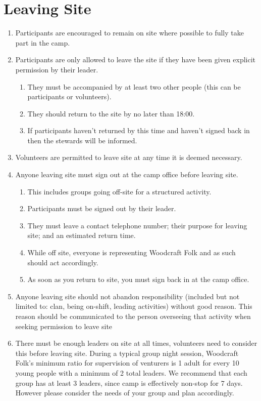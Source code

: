 \documentclass[a4paper, 11pt]{report}
\def\enumMarginIndentOne{4em}
\begin{document}
    \chapter{Leaving Site}
    \begin{enumerate}
        \item Participants are encouraged to remain on site where possible to fully take part in the camp.
        \item Participants are only allowed to leave the site if they have been given explicit permission by their leader.
        \begin{enumerate}[leftmargin=\enumMarginIndentOne]
            \item They must be accompanied by at least two other people (this can be participants or volunteers).
            \item They should return to the site by no later than 18:00.
            \item If participants haven't returned by this time and haven't signed back in then the stewards will be informed.
        \end{enumerate}
        \item Volunteers are permitted to leave site at any time it is deemed necessary.
        \item Anyone leaving site must sign out at the camp office before leaving site.
        \begin{enumerate}[leftmargin=\enumMarginIndentOne]
            \item This includes groups going off-site for a structured activity.
            \item Participants must be signed out by their leader.
            \item They must leave a contact telephone number; their purpose for leaving site; and an estimated return time. 
            \item While off site, everyone is representing Woodcraft Folk and as such should act accordingly. 
            \item As soon as you return to site, you must sign back in at the camp office. 
        \end{enumerate}
        \item Anyone leaving site should not abandon responsibility (included but not limited to: clan, being on-shift, leading activities) without good reason. This reason should be communicated to the person overseeing that activity when seeking permission to leave site
        \item There must be enough leaders on site at all times, volunteers need to consider this before leaving site. During a typical group night session, Woodcraft Folk's minimum ratio for supervision of venturers is 1 adult for every 10 young people with a minimum of 2 total leaders. We recommend that each group has at least 3 leaders, since camp is effectively non-stop for 7 days. However please consider the needs of your group and plan accordingly.
    \end{enumerate}
\end{document}
